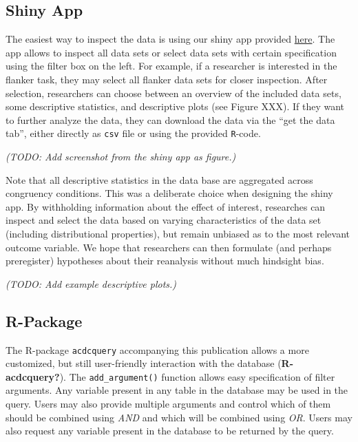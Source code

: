 \documentclass[
  man,floatsintext]{apa6}
\begin{document}
\hypertarget{shiny-app}{%
\subsection{Shiny App}\label{shiny-app}}

The easiest way to inspect the data is using our shiny app provided \href{LINKTOSHINYAPP}{here}. The app allows to inspect all data sets or select data sets with certain specification using the filter box on the left. For example, if a researcher is interested in the flanker task, they may select all flanker data sets for closer inspection. After selection, researchers can choose between an overview of the included data sets, some descriptive statistics, and descriptive plots (see Figure XXX). If they want to further analyze the data, they can download the data via the ``get the data tab'', either directly as \texttt{csv} file or using the provided \texttt{R}-code.

\emph{ (TODO: Add screenshot from the shiny app as figure.)}

Note that all descriptive statistics in the data base are aggregated across congruency conditions. This was a deliberate choice when designing the shiny app. By withholding information about the effect of interest, researches can inspect and select the data based on varying characteristics of the data set (including distributional properties), but remain unbiased as to the most relevant outcome variable. We hope that researchers can then formulate (and perhaps preregister) hypotheses about their reanalysis without much hindsight bias.

\emph{ (TODO: Add example descriptive plots.)}

\hypertarget{r-package}{%
\subsection{R-Package}\label{r-package}}

The R-package \texttt{acdcquery} accompanying this publication allows a more customized, but still user-friendly interaction with the database (\textbf{R-acdcquery?}). The \texttt{add\_argument()} function allows easy specification of filter arguments. Any variable present in any table in the database may be used in the query. Users may also provide multiple arguments and control which of them should be combined using \emph{AND} and which will be combined using \emph{OR}. Users may also request any variable present in the database to be returned by the query.
\end{document}
